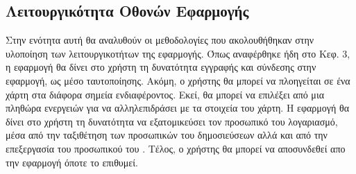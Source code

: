 \subsection{Λειτουργικότητα Οθονών Εφαρμογής}
Στην ενότητα αυτή θα αναλυθούν οι μεθοδολογίες που ακολουθήθηκαν στην υλοποίηση των λειτουργικοτήτων της εφαρμογής. Όπως αναφέρθηκε ήδη στο Κεφ. 3, η εφαρμογή θα δίνει στο χρήστη τη δυνατότητα εγγραφής και σύνδεσης στην εφαρμογή, ως μέσο ταυτοποίησης. Ακόμη, ο χρήστης θα μπορεί να πλοηγείται σε ένα χάρτη στα διάφορα σημεία ενδιαφέροντος. Εκεί, θα μπορεί να επιλέξει από μια πληθώρα ενεργειών για να αλληλεπιδράσει με τα στοιχεία του χάρτη. Η εφαρμογή θα δίνει στο χρήστη τη δυνατότητα να εξατομικεύσει τον προσωπικό του λογαριασμό, μέσα από την ταξιθέτηση των προσωπικών του δημοσιεύσεων αλλά και από την επεξεργασία του προσωπικού του . Τέλος, ο χρήστης θα μπορεί να αποσυνδεθεί απο την εφαρμογή όποτε το επιθυμεί.
 


